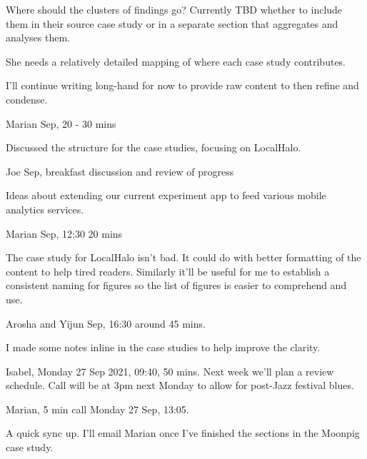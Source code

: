 Where should the clusters of findings go?
Currently TBD whether to include them in their source case study or in a separate section that aggregates and analyses them.

She needs a relatively detailed mapping of where each case study contributes.

I'll continue writing long-hand for now to provide raw content to then refine and condense.

\dotfill
Marian  Sep, 20 - 30 mins

Discussed the structure for the case studies, focusing on LocalHalo.

\dotfill
Joe  Sep, breakfast discussion and review of progress

Ideas about extending our current experiment app to feed various mobile analytics services. 

\dotfill
Marian  Sep, 12:30 20 mins

The case study for LocalHalo isn't bad. It could do with better formatting of the content to help tired readers. Similarly it'll be useful for me to establish a consistent naming for figures so the list of figures is easier to comprehend and use.

\dotfill
Arosha and Yijun  Sep, 16:30 around 45 mins.

I made some notes inline in the case studies to help improve the clarity.

\dotfill
Isabel, Monday 27 Sep 2021, 09:40, 50 mins.
Next week we'll plan a review schedule. Call will be at 3pm next Monday to allow for post-Jazz festival blues.

\dotfill
Marian, 5 min call Monday 27 Sep, 13:05.

A quick sync up. I'll email Marian once I've finished the sections in the Moonpig case study.

\dotfill

